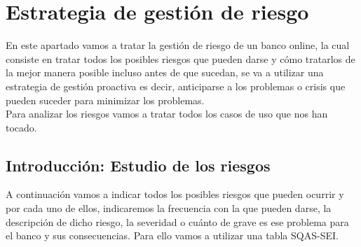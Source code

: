 \section{Estrategia de gestión de riesgo}
En este apartado vamos a tratar la gestión de riesgo de un banco online, la cual consiste en tratar todos los posibles riesgos que pueden darse y cómo tratarlos de la mejor manera posible incluso antes de que sucedan,  se va a utilizar una estrategia de gestión proactiva es decir, anticiparse a los problemas o crisis que pueden suceder para minimizar los problemas.\\
Para analizar los riesgos vamos a tratar todos los casos de uso que nos han tocado.

\subsection{Introducción: Estudio de los riesgos}
A continuación vamos a indicar todos los posibles riesgos que pueden ocurrir y por cada uno de ellos, indicaremos la frecuencia con la que pueden darse, la descripción de dicho riesgo, la severidad o cuánto de grave es ese problema para el banco y sus consecuencias.
Para ello vamos a utilizar una tabla SQAS-SEI.
